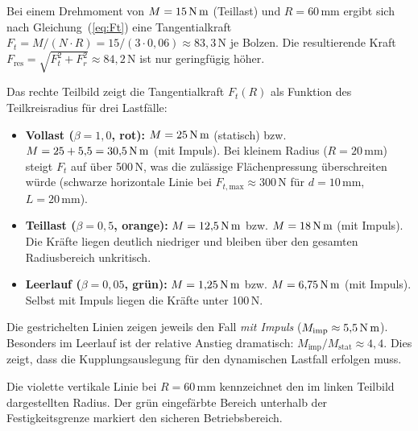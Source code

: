 ﻿\documentclass[a4paper,12pt]{article}
\begin{document}
Bei einem Drehmoment von $M = 15\,\text{N\,m}$ (Teillast) und $R = 60\,\text{mm}$
ergibt sich nach Gleichung~(\ref{eq:Ft}) eine Tangentialkraft
$F_t = M / (N \cdot R) = 15 / (3 \cdot 0{,}06) \approx 83{,}3\,\text{N}$
je Bolzen. Die resultierende Kraft $F_\text{res} = \sqrt{F_t^2 + F_r^2} \approx 84{,}2\,\text{N}$
ist nur geringfügig höher.

Das rechte Teilbild zeigt die Tangentialkraft $F_t(R)$ als Funktion des
Teilkreisradius für drei Lastfälle:

\begin{itemize}
  \item \textbf{Vollast ($\beta = 1{,}0$, rot):} $M = 25\,\text{N\,m}$
    (statisch) bzw. $M = 25 + 5{,}5 = 30{,}5\,\text{N\,m}$ (mit Impuls).
    Bei kleinem Radius ($R = 20\,\text{mm}$) steigt $F_t$ auf über 500\,N,
    was die zulässige Flächenpressung überschreiten würde (schwarze horizontale
    Linie bei $F_{t,\text{max}} \approx 300\,\text{N}$ für $d = 10\,\text{mm}$,
    $L = 20\,\text{mm}$).

  \item \textbf{Teillast ($\beta = 0{,}5$, orange):} $M = 12{,}5\,\text{N\,m}$
    bzw. $M = 18\,\text{N\,m}$ (mit Impuls). Die Kräfte liegen deutlich
    niedriger und bleiben über den gesamten Radiusbereich unkritisch.

  \item \textbf{Leerlauf ($\beta = 0{,}05$, grün):} $M = 1{,}25\,\text{N\,m}$
    bzw. $M = 6{,}75\,\text{N\,m}$ (mit Impuls). Selbst mit Impuls liegen
    die Kräfte unter 100\,N.
\end{itemize}

Die gestrichelten Linien zeigen jeweils den Fall \textit{mit Impuls} ($M_\text{imp} \approx 5{,}5\,\text{N\,m}$).
Besonders im Leerlauf ist der relative Anstieg dramatisch: $M_\text{imp}/M_\text{stat} \approx 4{,}4$.
Dies zeigt, dass die Kupplungsauslegung für den dynamischen Lastfall erfolgen muss.

Die violette vertikale Linie bei $R = 60\,\text{mm}$ kennzeichnet den im
linken Teilbild dargestellten Radius. Der grün eingefärbte Bereich unterhalb
der Festigkeitsgrenze markiert den sicheren Betriebsbereich.
\end{document}
